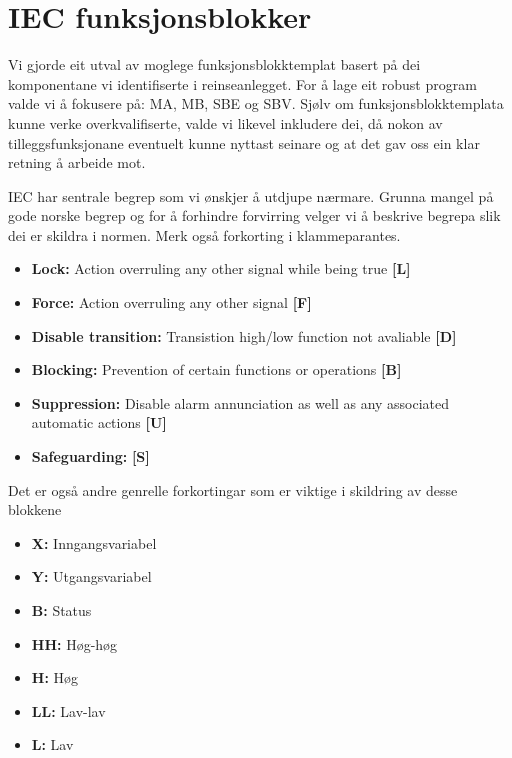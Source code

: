 \section{IEC funksjonsblokker} \label{IEC Seksjon}
\thispagestyle{fancy}

Vi gjorde eit utval av moglege funksjonsblokktemplat basert på dei komponentane vi identifiserte i reinseanlegget.
For å lage eit robust program valde vi å fokusere på: \gls{MA}, \gls{MB}, \gls{SBE} og \gls{SBV}.
Sjølv om funksjonsblokktemplata kunne verke overkvalifiserte, valde vi likevel inkludere dei, då nokon av tilleggsfunksjonane eventuelt kunne nyttast seinare
og at det gav oss ein klar retning å arbeide mot.

\gls{IEC} har sentrale begrep som vi ønskjer å utdjupe nærmare. Grunna mangel på gode norske begrep
og for å forhindre forvirring velger vi å beskrive begrepa slik dei er skildra i normen. \newline
Merk også forkorting i klammeparantes.

\begin{itemize}
    \item \textbf{Lock:} Action overruling any other signal while being true        \textbf{[L]}
    \item \textbf{Force:} Action overruling any other signal                        \textbf{[F]}
    \item \textbf{Disable transition:} Transistion high/low function not avaliable  \textbf{[D]}
    \item \textbf{Blocking:} Prevention of certain functions or operations          \textbf{[B]}
    \item \textbf{Suppression:} Disable alarm annunciation as well as any associated automatic actions \textbf{[U]}
    \item \textbf{Safeguarding:} \textbf{[S]}
\end{itemize}

Det er også andre genrelle forkortingar som er viktige i skildring av desse blokkene

\begin{itemize}
    \item \textbf{X:}   Inngangsvariabel
    \item \textbf{Y:}   Utgangsvariabel
    \item \textbf{B:}   Status
    \item \textbf{HH:}  Høg-høg
    \item \textbf{H:}   Høg
    \item \textbf{LL:}  Lav-lav
    \item \textbf{L:}   Lav
\end{itemize}

